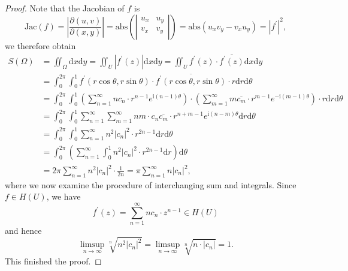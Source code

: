 \begin{proof}
Note that the Jacobian of $f$ is 
$$
\mathrm{Jac}\left( f \right) =\left| \frac{\partial \left( u,v \right)}{\partial \left( x,y \right)} \right|=\mathrm{abs} \left( \left| \begin{matrix}
	u_x&		u_y\\
	v_x&		v_y\\
\end{matrix} \right| \right) =\mathrm{abs} \left( u_xv_y-v_xu_y \right) =\left| f^{\prime} \right|^2,
$$
we therefore obtain 
$$
\begin{aligned}
S\left( \Omega \right) &=\iint_{\Omega}{\mathrm{d}x\mathrm{d}y}=\iint_U{\left| f^{\prime}\left( z \right) \right|\mathrm{d}x\mathrm{d}y}=\iint_U{f^{\prime}\left( z \right) \cdot \overline{f^{\prime}\left( z \right) }\mathrm{d}x\mathrm{d}y}
\\
&=\int_0^{2\pi}{\int_0^1{f^{\prime}\left( r\cos \theta ,r\sin \theta \right) \cdot \overline{f^{\prime}\left( r\cos \theta ,r\sin \theta \right) }\cdot r\mathrm{d}r\mathrm{d}\theta}}
\\
&=\int_0^{2\pi}{\int_0^1{\left( \sum_{n=1}^{\infty}{nc_n\cdot r^{n-1}e^{\mathrm{i}\left( n-1 \right) \theta}} \right) \cdot \left( \sum_{m=1}^{\infty}{m\overline{c_m}\cdot r^{m-1}e^{-\mathrm{i}\left( m-1 \right) \theta}} \right) \cdot r\mathrm{d}r\mathrm{d}\theta}}
\\
&=\int_0^{2\pi}{\int_0^1{\sum_{n=1}^{\infty}{\sum_{m=1}^{\infty}{nm\cdot c_n\overline{c_m}\cdot r^{n+m-1}e^{\mathrm{i}\left( n-m \right) \theta}}}\mathrm{d}r}\mathrm{d}\theta}
\\
&=\int_0^{2\pi}{\int_0^1{\sum_{n=1}^{\infty}{n^2\left| c_n \right|^2\cdot r^{2n-1}\mathrm{d}r\mathrm{d}\theta}}}
\\
&=\int_0^{2\pi}{\left( \sum_{n=1}^{\infty}{\int_0^1{n^2\left| c_n \right|^2\cdot r^{2n-1}\mathrm{d}r}} \right) \mathrm{d}\theta}
\\
&=2\pi \sum_{n=1}^{\infty}{n^2\left| c_n \right|^2\cdot \frac{1}{2n}}=\pi \sum_{n=1}^{\infty}{n\left| c_n \right|^2},
\end{aligned}
$$
where we now examine the procedure of interchanging sum and integrals. Since $f\in H(U)$, we have 
$$
f^{\prime}\left( z \right) =\sum_{n=1}^{\infty}{nc_n\cdot z^{n-1}}\in H\left( U \right) 
$$
and hence 
$$
\mathop {\lim\mathrm{sup}} \limits_{n\rightarrow \infty}\sqrt[n]{n^2\left| c_n \right|^2}=\mathop {\lim\mathrm{sup}} \limits_{n\rightarrow \infty}\sqrt[n]{n\cdot \left| c_n \right|}=1.
$$
This finished the proof.
\end{proof}